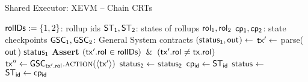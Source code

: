 \begin{algorithm}[H]
    \small
    \caption{Shared Executor: XEVM -- Chain CRTs}
    \label{alg:shared-executor-xevm-chain-crt}

    \begin{algorithmic}[1]
    \Variables
        \State $\mathsf{rolIDs} := \{1,2\}$: rollup ids
        \State $\mathsf{ST_{1}}, \mathsf{ST_{2}}$: states of rollups $\mathsf{rol}_{1}, \mathsf{rol}_{2}$
        \State $\mathsf{cp_{1}}, \mathsf{cp_{2}}$: state checkpoints
        \State $\mathsf{GSC}_1, \mathsf{GSC}_2$: General System contracts
    \EndVariables
    \Statex
        \State $(\mathsf{status_{1}}, \mathsf{out}_{}) \gets $ 
        \State $\mathsf{tx}' \gets $ parse($\mathsf{out}_{}$)
         \Return $\mathsf{status_{1}}$ \EndIf
        \State \textbf{Assert} $(\tx'.\rol{} \in \rolids) \And (\tx'.\rol{} \neq \tx.\rol{})$
        \State $\tx'' \gets \gsc_{\tx'.\rol{}}.\action(\langle \tx' \rangle)$
        \State $\mathsf{status_{2}} \gets$ 
        \State \Return $\mathsf{status_{2}}$
    \EndFunction
    \Statex
        \For{$\id : \rolids$}
            \State $\mathsf{cp_{\mathsf{id}}} \gets \mathsf{ST_{\mathsf{id}}}$
        \EndFor
        \State $\mathsf{status_{}} \gets $ 
        \If{$(\status{} = \false $}
            \For{$\id : \rolids$}
                \State $\mathsf{ST_{\mathsf{id}}} \gets \mathsf{cp_{\mathsf{id}}}$
            \EndFor
        \EndIf
        
    \EndFunction
\end{algorithmic}
    
\end{algorithm}
